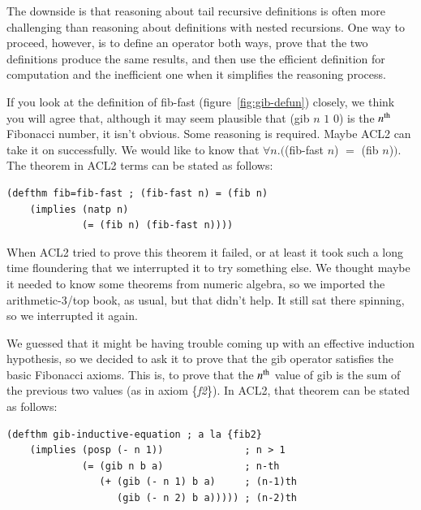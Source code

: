 The downside is that reasoning
about tail recursive
definitions is often more challenging than reasoning about definitions
with nested recursions. One way to proceed, however,
is to define an operator both ways, prove that the two definitions
produce the same results, and then use the efficient definition
for computation and the inefficient one when it
simplifies the reasoning process.

If you look at the definition of \textsf{fib-fast} (figure~\ref{fig:gib-defun})
closely, we think you will agree that, although it may seem plausible
that \textsf{(gib $n$ $1$ $0$)} is the $n^\textnormal{th}$ Fibonacci number,
it isn't obvious.
Some reasoning is required.
Maybe ACL2 can take it on successfully.
We would like to know that $\forall n.($\textsf{(fib-fast $n$)} $=$ \textsf{(fib $n$)}$)$.
The theorem in ACL2 terms can be stated as follows:
\begin{center}
\begin{code}
\begin{verbatim}
(defthm fib=fib-fast ; (fib-fast n) = (fib n)
    (implies (natp n)
             (= (fib n) (fib-fast n))))
\end{verbatim}
\end{code}
\end{center}

When ACL2 tried to prove this theorem it failed,
or at least it took such a long time floundering that we interrupted it
to try something else.
We thought maybe it needed to know some theorems from numeric
algebra, so we imported the arithmetic-3/top book, as usual,
but that didn't help. It still sat there spinning,
so we interrupted it again.

We guessed that it might be having trouble coming up with an effective
induction hypothesis, so we decided to ask it to prove that
the \textsf{gib} operator satisfies the basic Fibonacci axioms.
This is, to prove that the $n^\textnormal{th}$ value of \textsf{gib} is
the sum of the previous two values (as in axiom \{\emph{f2}\}).
In ACL2, that theorem can be stated as follows:
\begin{center}
\begin{code}
\begin{verbatim}
(defthm gib-inductive-equation ; a la {fib2}
    (implies (posp (- n 1))              ; n > 1
             (= (gib n b a)              ; n-th
                (+ (gib (- n 1) b a)     ; (n-1)th
                   (gib (- n 2) b a))))) ; (n-2)th
\end{verbatim}
\end{code}
\end{center}

